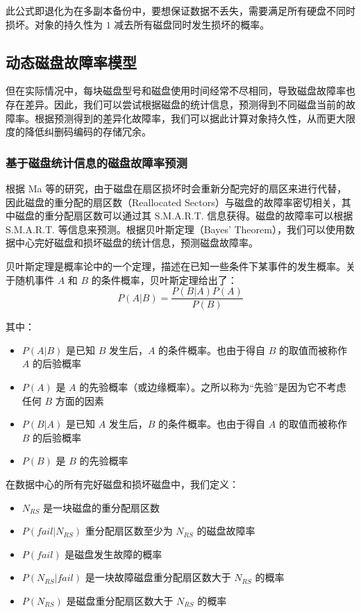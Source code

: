 此公式即退化为在多副本备份中，要想保证数据不丢失，需要满足所有硬盘不同时损坏。对象的持久性为 $1$ 减去所有磁盘同时发生损坏的概率。
\subsection{动态磁盘故障率模型}
但在实际情况中，每块磁盘型号和磁盘使用时间经常不尽相同，导致磁盘故障率也存在差异。因此，我们可以尝试根据磁盘的统计信息，预测得到不同磁盘当前的故障率。根据预测得到的差异化故障率，我们可以据此计算对象持久性，从而更大限度的降低纠删码编码的存储冗余。
\subsubsection{基于磁盘统计信息的磁盘故障率预测}
根据 Ma 等\cite{ma2015raidshield}的研究，由于磁盘在扇区损坏时会重新分配完好的扇区来进行代替，因此磁盘的重分配的扇区数（Reallocated Sectors）与磁盘的故障率密切相关，其中磁盘的重分配扇区数可以通过其 S.M.A.R.T. 信息\cite{allen2004monitoring}获得。磁盘的故障率可以根据 S.M.A.R.T. 等信息来预测\cite{xu2018improving,mahdisoltani2017proactive,lu2020making,dos2017predicting,chaves2018hard,botezatu2016predicting,anantharaman2018large}。根据贝叶斯定理（Bayes' Theorem），我们可以使用数据中心完好磁盘和损坏磁盘的统计信息，预测磁盘故障率。

贝叶斯定理是概率论中的一个定理，描述在已知一些条件下某事件的发生概率。关于随机事件 $A$ 和 $B$ 的条件概率，贝叶斯定理给出了：
$$
P(A|B)=\dfrac{P(B|A)P(A)}{P(B)}
$$

其中：
\begin{itemize}
\item $P(A|B)$ 是已知 $B$ 发生后，$A$ 的条件概率。也由于得自 $B$ 的取值而被称作 $A$ 的后验概率
\item $P(A)$ 是 $A$ 的先验概率（或边缘概率）。之所以称为“先验”是因为它不考虑任何 $B$ 方面的因素
\item $P(B|A)$ 是已知 $A$ 发生后，$B$ 的条件概率。也由于得自 $A$ 的取值而被称作 $B$ 的后验概率
\item $P(B)$ 是 $B$ 的先验概率
\end{itemize}

在数据中心的所有完好磁盘和损坏磁盘中，我们定义：
\begin{itemize}
\item $N_{RS}$ 是一块磁盘的重分配扇区数
\item $P(fail|N_{RS})$ 重分配扇区数至少为 $N_{RS}$ 的磁盘故障率
\item $P(fail)$ 是磁盘发生故障的概率
\item $P(N_{RS}|fail)$ 是一块故障磁盘重分配扇区数大于 $N_{RS}$ 的概率
\item $P(N_{RS})$ 是磁盘重分配扇区数大于 $N_{RS}$ 的概率
\end{itemize}


